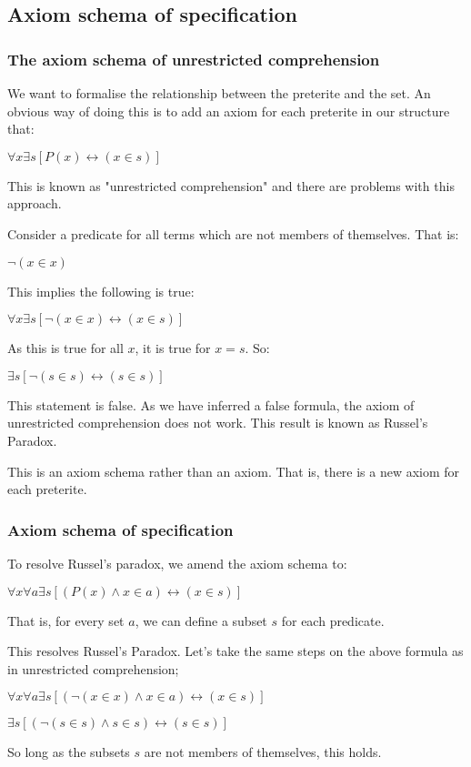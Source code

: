 
\subsection{Axiom schema of specification}

\subsubsection{The axiom schema of unrestricted comprehension}

We want to formalise the relationship between the preterite and the set. An obvious way of doing this is to add an axiom for each preterite in our structure that:

\(\forall x \exists s[P(x)\leftrightarrow (x\in s)]\)

This is known as "unrestricted comprehension" and there are problems with this approach.

Consider a predicate for all terms which are not members of themselves. That is:

\(\neg (x\in x)\)

This implies the following is true:

\(\forall x\exists s[\neg (x\in x) \leftrightarrow (x\in s)]\)

As this is true for all \(x\), it is true for \(x=s\). So:

\(\exists s[\neg (s\in s) \leftrightarrow (s  \in s)]\)

This statement is false. As we have inferred a false formula, the axiom of unrestricted comprehension does not work. This result is known as Russel's Paradox.

This is an axiom schema rather than an axiom. That is, there is a new axiom for each preterite.

\subsubsection{Axiom schema of specification}

To resolve Russel's paradox, we amend the axiom schema to:

\(\forall x \forall a \exists s[(P(x)\land x\in a )\leftrightarrow (x\in s)]\)

That is, for every set \(a\), we can define a subset \(s\) for each predicate.

This resolves Russel's Paradox. Let's take the same steps on the above formula as in unrestricted comprehension;

\(\forall x \forall a \exists s[(\neg (x\in x)\land x\in a )\leftrightarrow (x\in s)]\)

\(\exists s[(\neg (s\in s)\land s\in s )\leftrightarrow (s\in s)]\)

So long as the subsets \(s\) are not members of themselves, this holds.

